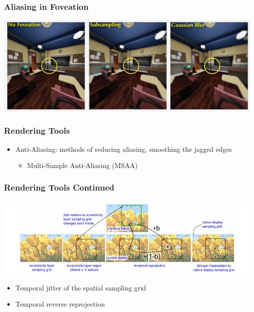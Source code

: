 \documentclass{beamer}
\begin{document}
\begin{frame}
  \frametitle{Aliasing in Foveation}
  
  	\begin{center}
    		\includegraphics[width=1\textwidth]{Illustrations/foveation.png}
  	\end{center}
  
\end{frame}


\begin{frame}
  \frametitle{Rendering Tools}
	\begin{itemize}
		\item Anti-Aliasing: methods of reducing aliasing, smoothing the jagged edges
			\begin{itemize}
				\item Multi-Sample Anti-Aliasing (MSAA)
			\end{itemize}
	\end{itemize}
\end{frame}

\begin{frame}
  \frametitle{Rendering Tools Continued}
  
 	 \begin{center}
  		\includegraphics[width=\textwidth]{Illustrations/jitter.png}
  	\end{center}
  	
	\begin{itemize}
		\item Temporal jitter of the spatial sampling grid
		\item Temporal reverse reprojection
	\end{itemize}
\end{frame}
\end{document}
